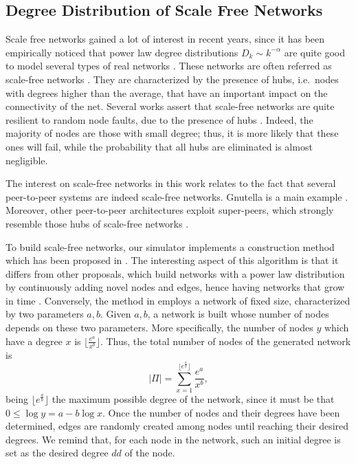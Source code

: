 \documentclass[a4paper,twosided]{article}
\begin{document}
\subsection{Degree Distribution of Scale Free Networks}

Scale free networks gained a lot of interest in recent years, since it has been empirically noticed that power law degree distributions $\mathit{D_k \sim k^{-\alpha}}$ 
are quite good to model several types of real networks \cite{Barabasi2000,Verlag03structuralproperties,Faloutsos:1999,Price:1965,Adamic03localsearch,dobrescu,conf/nca/GarbinatoRT07}.
These networks are often referred as scale-free networks \cite{Newman03thestructure,simutools}.
They are characterized by the presence of hubs, i.e.~nodes with degrees higher than the average, that have an important impact on the connectivity of the net. Several works assert that scale-free networks are quite resilient to random node faults, due to the presence of hubs \cite{2000Nature_Albert,newmanHandbook}. Indeed, the majority of nodes are those with small degree; thus, it is more likely that these ones will fail, while the probability that all hubs are eliminated is almost negligible. 


The interest on scale-free networks in this work relates to the fact that several peer-to-peer systems are indeed scale-free networks. Gnutella is a main example \cite{Adamic03localsearch}. Moreover, other peer-to-peer architectures exploit super-peers, which strongly resemble those hubs of scale-free networks \cite{cooper,garbacki,lin,pyun}.


To build scale-free networks, our simulator implements a construction method which has been proposed in \cite{Aiello00arandom}. 
The interesting aspect of this algorithm is that it differs from other proposals, which build networks with a power law distribution by continuously adding novel nodes and edges, hence having networks that grow in time
\cite{Barabasi2000,barab99}. Conversely, the method in \cite{Aiello00arandom} employs a network of fixed size, characterized by two parameters $a, b$. Given $a, b$, a network is built whose number of nodes depends on these two parameters. More specifically, the number of nodes $y$ which have a degree $x$ is $\lfloor\frac{e^a}{x^b}\rfloor$. Thus, the total number of nodes of the generated network is 
$$|\Pi| = \sum_{x=1}^{\lfloor e^{\frac{a}{b}}\rfloor} \frac{e^a}{x^b},$$
being $\lfloor e^{\frac{a}{b}}\rfloor$ the maximum possible degree of the network, since it must be that $0 \leq \log{y} = a - b \log{x}$.
Once the number of nodes and their degrees have been determined, edges are randomly created among nodes until reaching their desired degrees.
We remind that, for each node in the network, such an initial degree is set as the desired degree $dd$ of the node.
\end{document}
